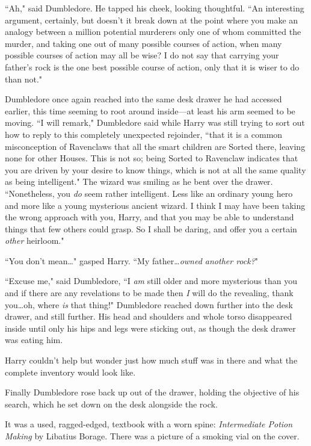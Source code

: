``Ah," said Dumbledore. He tapped his cheek, looking thoughtful. ``An interesting argument, certainly, but doesn't it break down at the point where you make an analogy between a million potential murderers only one of whom committed the murder, and taking one out of many possible courses of action, when many possible courses of action may all be wise? I do not say that carrying your father's rock is the one best possible course of action, only that it is wiser to do than not."

Dumbledore once again reached into the same desk drawer he had accessed earlier, this time seeming to root around inside—at least his arm seemed to be moving. ``I will remark," Dumbledore said while Harry was still trying to sort out how to reply to this completely unexpected rejoinder, ``that it is a common misconception of Ravenclaws that all the smart children are Sorted there, leaving none for other Houses. This is not so; being Sorted to Ravenclaw indicates that you are driven by your desire to know things, which is not at all the same quality as being intelligent." The wizard was smiling as he bent over the drawer. ``Nonetheless, you \emph{do} seem rather intelligent. Less like an ordinary young hero and more like a young mysterious ancient wizard. I think I may have been taking the wrong approach with you, Harry, and that you may be able to understand things that few others could grasp. So I shall be daring, and offer you a certain \emph{other} heirloom."

``You don't mean…" gasped Harry. ``My father…\emph{owned another rock?}"

``Excuse me," said Dumbledore, ``I \emph{am} still older and more mysterious than you and if there are any revelations to be made then \emph{I} will do the revealing, thank you…oh, where \emph{is} that thing!" Dumbledore reached down further into the desk drawer, and still further. His head and shoulders and whole torso disappeared inside until only his hips and legs were sticking out, as though the desk drawer was eating him.

Harry couldn't help but wonder just how much stuff was in there and what the complete inventory would look like.

Finally Dumbledore rose back up out of the drawer, holding the objective of his search, which he set down on the desk alongside the rock.

It was a used, ragged-edged, textbook with a worn spine: \emph{Intermediate Potion Making} by Libatius Borage. There was a picture of a smoking vial on the cover.

